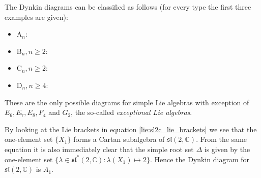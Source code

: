     \begin{property}[Classification]
        The Dynkin diagrams can be classified as follows (for every type the first three examples are given):
        \begin{itemize}
            \item A$_n$: \begin{center}\dynk {}  \end{center}
        \item B$_n, n\geq2$: \begin{center}   \end{center}
        \item C$_n, n\geq2$: \begin{center}   \end{center}
        \item D$_n, n\geq4$: \begin{center}   \end{center}
        \end{itemize}
        These are the only possible diagrams for simple Lie algebras with exception of $E_6,E_7,E_8,F_4$ and $G_2$, the so-called \textit{exceptional Lie algebras}.
    \end{property}

    \begin{example}
        By looking at the Lie brackets in equation \ref{lie:sl2c_lie_brackets} we see that the one-element set $\{X_1\}$ forms a Cartan subalgebra of $\mathfrak{sl}(2, \mathbb{C})$. From the same equation it is also immediately clear that the simple root set $\Delta$ is given by the one-element set $\{\lambda\in\mathfrak{sl}^*(2, \mathbb{C}): \lambda(X_1)\mapsto 2\}$. Hence the Dynkin diagram for $\mathfrak{sl}(2, \mathbb{C})$ is $A_1$.
    \end{example}

